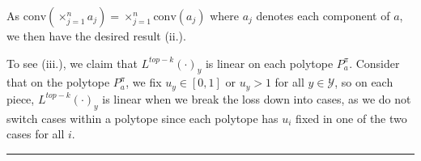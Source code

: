 \documentclass[12pt]{article}
\newcommand{\Comments}{1}
\newcommand{\mynote}[2]{\ifnum\Comments=1\textcolor{#1}{#2}\fi}
\newcommand{\jessie}[1]{\mynote{purple}{[JF: #1]}}
\newcommand{\R}{\mathcal{R}}
\newcommand{\U}{\mathcal{U}}
\newcommand{\Y}{\mathcal{Y}}
\newcommand{\conv}{\mathrm{conv}}
\begin{document}
As $\conv(\times_{j=1}^n a_j) = \times_{j=1}^n \conv(a_j)$ where $a_j$ denotes each component of $a$, we then have the desired result (ii.).

%


To see (iii.), we claim that $L^{top-k}(\cdot)_y$ is linear on each polytope $P^\pi_a$.
Consider that on the polytope $P^\pi_a$, we fix $u_y \in [0,1]$ or $u_y >1$ for all $y \in \Y$, so on each piece, $L^{top-k}(\cdot)_y$ is linear when we break the loss down into cases, as we do not switch cases within a polytope since each polytope has $u_i$ fixed in one of the two cases for all $i$.


%
%
%
%
%
%	

\bigskip
\hrule
\bigskip
\end{document}
